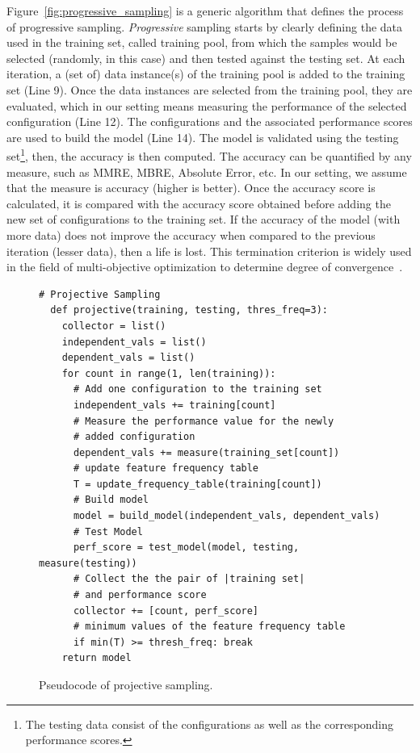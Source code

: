 \documentclass[sigconf]{acmart}
\begin{document}
Figure~\ref{fig:progressive_sampling} is a generic algorithm that defines the process of progressive sampling. \emph{Progressive} sampling starts by clearly defining the data used in the training set, called training pool, from which the samples would be selected (randomly, in this case) and then tested against the testing set. At each iteration, a (set of) data instance(s) of the training pool is added to the training set (Line 9). Once the data instances are selected from the training pool, they are evaluated, which in our setting means measuring the performance of the selected configuration (Line 12). The configurations and the associated performance scores are used to build  the model (Line 14). The model is validated using the testing set\footnote{The testing data consist of the configurations as well as the corresponding performance scores.}, then, the accuracy is then computed. The accuracy can be quantified by any measure, such as MMRE, MBRE, Absolute Error, etc. In our setting, we assume that the measure is accuracy (higher is better). Once the accuracy score is calculated, it is compared with the accuracy score obtained before adding the new set of configurations to the training set. If the accuracy of the model (with more data) does not improve the accuracy when compared to the previous iteration (lesser data), then a life is lost. This termination criterion is widely used in the field of multi-objective optimization to determine degree of convergence~\cite{krall2015gale}.



\begin{figure}[!t]
\small
\hspace{0.4cm}\begin{lstlisting}[xrightmargin=5.0ex, mathescape,frame=none,numbers=right]
  # Projective Sampling
  def projective(training, testing, thres_freq=3): 
    collector = list()
    independent_vals = list()
    dependent_vals = list()
    for count in range(1, len(training)):    
      # Add one configuration to the training set
      independent_vals += training[count]      
      # Measure the performance value for the newly
      # added configuration 
      dependent_vals += measure(training_set[count])  
      # update feature frequency table 
      T = update_frequency_table(training[count])
      # Build model
      model = build_model(independent_vals, dependent_vals)     
      # Test Model
      perf_score = test_model(model, testing, measure(testing))
      # Collect the the pair of |training set| 
      # and performance score
      collector += [count, perf_score]
      # minimum values of the feature frequency table
      if min(T) >= thresh_freq: break
    return model
\end{lstlisting}
\caption{\small{Pseudocode of projective sampling.}
}
\label{fig:projective_sampling} 
\end{figure}
\end{document}
